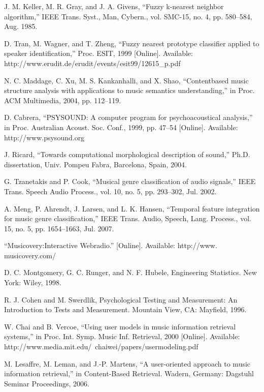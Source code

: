 \documentclass[journal, twoside]{IEEEtran}
\begin{document}
\begin{thebibliography}{1}
J. M. Keller, M. R. Gray, and J. A. Givens, “Fuzzy k-nearest neighbor
algorithm,” IEEE Trans. Syst., Man, Cybern., vol. SMC-15, no. 4, pp.
580–584, Aug. 1985.


D. Tran, M. Wagner, and T. Zheng, “Fuzzy nearest prototype classifier
applied to speaker identification,” Proc. ESIT, 1999 [Online]. Available: http://www.erudit.de/erudit/events/esit99/12615\_p.pdf


N. C. Maddage, C. Xu, M. S. Kankanhalli, and X. Shao, “Contentbased music structure analysis with applications to music semantics
understanding,” in Proc. ACM Multimedia, 2004, pp. 112–119.


D. Cabrera, “PSYSOUND: A computer program for psychoacoustical
analysis,” in Proc. Australian Acoust. Soc. Conf., 1999, pp. 47–54 [Online]. Available: http://www.psysound.org


J. Ricard, “Towards computational morphological description of
sound,” Ph.D. dissertation, Univ. Pompeu Fabra, Barcelona, Spain,
2004.



G. Tzanetakis and P. Cook, “Musical genre classification of audio signals,” IEEE Trans. Speech Audio Process., vol. 10, no. 5, pp. 293–302,
Jul. 2002.


A. Meng, P. Ahrendt, J. Larsen, and L. K. Hansen, “Temporal feature
integration for music genre classification,” IEEE Trans. Audio, Speech,
Lang. Process., vol. 15, no. 5, pp. 1654–1663, Jul. 2007.



“Musicovery:Interactive Webradio.” [Online]. Available: http://www.
musicovery.com/


D. C. Montgomery, G. C. Runger, and N. F. Hubele, Engineering Statistics. New York: Wiley, 1998.


R. J. Cohen and M. Swerdlik, Psychological Testing and Measurement: An Introduction to Tests and Measurement. Mountain View,
CA: Mayfield, 1996.


W. Chai and B. Vercoe, “Using user models in music information retrieval systems,” in Proc. Int. Symp. Music Inf. Retrieval, 2000 [Online]. Available: http://www.media.mit.edu/~chaiwei/papers/usermodeling.pdf



M. Lesaffre, M. Leman, and J.-P. Martens, “A user-oriented approach
to music information retrieval,” in Content-Based Retrieval. Wadern,
Germany: Dagstuhl Seminar Proceedings, 2006.





\end{thebibliography}
\end{document}
